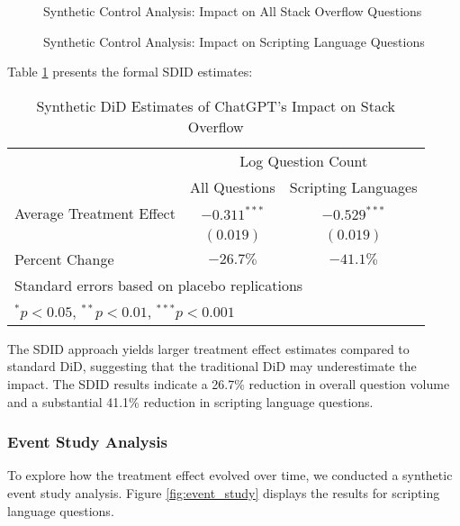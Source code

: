\begin{figure}[htb]
\centering
\caption{Synthetic Control Analysis: Impact on All Stack Overflow Questions}
\label{fig:sdid_all}
\end{figure}

\begin{figure}[htb]
\centering
\caption{Synthetic Control Analysis: Impact on Scripting Language Questions}
\label{fig:sdid_script}
\end{figure}

Table \ref{tab:sdid_results} presents the formal SDID estimates:

\begin{table}[htpb!]
    \centering
    \caption{Synthetic DiD Estimates of ChatGPT's Impact on Stack Overflow}
    \label{tab:sdid_results}
    \begin{tabular}{lcc}
        \toprule
            & \multicolumn{2}{c}{Log Question Count} \\
            \cmidrule(lr){2-3}
            & All Questions & Scripting Languages \\
        \midrule
            Average Treatment Effect & $-0.311^{***}$ & $-0.529^{***}$ \\
            & $(0.019)$      & $(0.019)$ \\
            \midrule
            Percent Change & $-26.7\%$ & $-41.1\%$ \\
        \bottomrule
            \multicolumn{3}{l}{\footnotesize Standard errors based on placebo replications} \\
            \multicolumn{3}{l}{\footnotesize $^{*}p<0.05$, $^{**}p<0.01$, $^{***}p<0.001$} \\
    \end{tabular}
\end{table}

The SDID approach yields larger treatment effect estimates compared to standard DiD, suggesting that the traditional DiD may underestimate the impact. The SDID results indicate a 26.7\% reduction in overall question volume and a substantial 41.1\% reduction in scripting language questions.

\subsubsection{Event Study Analysis}
To explore how the treatment effect evolved over time, we conducted a synthetic event study analysis. Figure \ref{fig:event_study} displays the results for scripting language questions.

